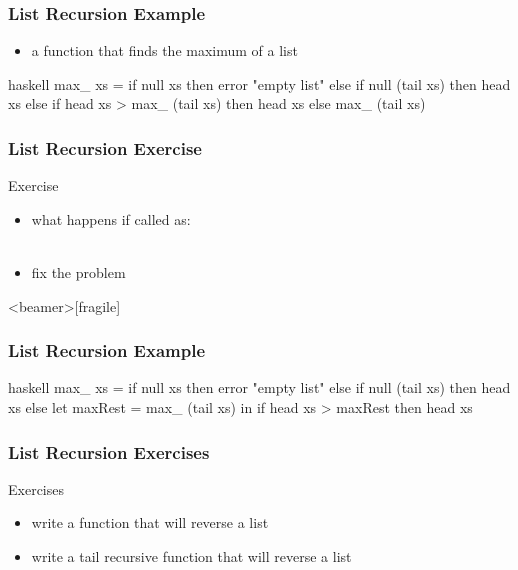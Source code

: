 \documentclass[dvipsnames]{beamer}
\theoremstyle{plain}
\begin{document}
\begin{frame}[fragile]
  \frametitle{List Recursion Example}

  \begin{example}
    \begin{itemize}
      \item a function that finds the maximum of a list
    \end{itemize}

    \pause
    \begin{pygments}{haskell}
max_ xs =
    if null xs
    then error "empty list"
    else if null (tail xs)
         then head xs
         else if head xs > max_ (tail xs)
              then head xs
              else max_ (tail xs)
    \end{pygments}
  \end{example}
\end{frame}

\begin{frame}[fragile]
  \frametitle{List Recursion Exercise}

  \begin{block}{Exercise}
    \begin{itemize}
      \item what happens if called as:\\
        \\
      \item fix the problem
   \end{itemize}
  \end{block}
\end{frame}

\begin{frame}<beamer>[fragile]
  \frametitle{List Recursion Example}

  \begin{example}
    \begin{pygments}{haskell}
max_ xs =
    if null xs
    then error "empty list"
    else if null (tail xs)
         then head xs
         else
             let
                 maxRest = max_ (tail xs)
             in
                 if head xs > maxRest
                 then head xs
    \end{pygments}
  \end{example}
\end{frame}

\begin{frame}
  \frametitle{List Recursion Exercises}

  \begin{block}{Exercises}
    \begin{itemize}
      \item write a function that will reverse a list
      \item write a tail recursive function that will reverse a list
    \end{itemize}
  \end{block}
\end{frame}
\end{document}

